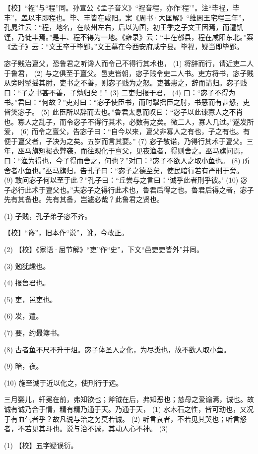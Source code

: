 \documentclass[12pt,UTF8]{ctexbook}
\begin{document}
【校】“裎”与“程”同。孙宣公《孟子音义》“裎音程，亦作‘程’”。注“毕裎，毕丰”，盖以丰即程也。毕、丰皆在咸阳。案《周书·大匡解》“维周王宅程三年”，孔晁注云：“程，地名，在岐州左右，后以为国，初王季之子文王因焉，而遭饥馑，乃徙丰焉。”是丰、程不得为一地。《雍录》云：“丰在鄠县，程在咸阳东北。”案《孟子》云：“文王卒于毕郢。”文王墓在今西安府咸宁县。毕裎，疑当即毕郢。

宓子贱治亶父，恐鲁君之听谗人而令己不得行其术也， (1) 将辞而行，请近吏二人于鲁君， (2) 与之俱至于亶父。邑吏皆朝，宓子贱令吏二人书。吏方将书，宓子贱从旁时掣摇其肘，吏书之不善，则宓子贱为之怒。吏甚患之，辞而请归。宓子贱曰：“子之书甚不善，子勉归矣！” (3) 二吏归报于君， (4) 曰：“宓子不得为书。”君曰：“何故？”吏对曰：“宓子使臣书，而时掣摇臣之肘，书恶而有甚怒，吏皆笑宓子。 (5) 此臣所以辞而去也。”鲁君太息而叹曰：“宓子以此谏寡人之不肖也。寡人之乱子，而令宓子不得行其术，必数有之矣。微二人，寡人几过。”遂发所爱， (6) 而令之亶父，告宓子曰：“自今以来，亶父非寡人之有也，子之有也。有便于亶父者，子决为之矣。五岁而言其要。” (7) 宓子敬诺，乃得行其术于亶父。三年，巫马旗短褐衣弊袭，而往观化于亶父，见夜渔者，得则舍之。巫马旗问焉，曰：“渔为得也，今子得而舍之，何也？”对曰：“宓子不欲人之取小鱼也。 (8) 所舍者小鱼也。”巫马旗归，告孔子曰：“宓子之德至矣，使民暗行若有严刑于旁。 (9) 敢问宓子何以至于此？”孔子曰：“丘尝与之言曰：‘诚乎此者刑乎彼。’ (10) 宓子必行此术于亶父也。”夫宓子之得行此术也，鲁君后得之也。鲁君后得之者，宓子先有其备也。先有其备，岂遽必哉？此鲁君之贤也。

(1) 子贱，孔子弟子宓不齐。

【校】“谗”，旧本作“说”，讹，今改正。

(2) 【校】《家语·屈节解》“吏”作“史”，下文“邑吏吏皆外”并同。

(3) 勉犹趣也。

(4) 报鲁君也。

(5) 吏，邑吏也。

(6) 发，遣。

(7) 要，约最簿书。

(8) 古者鱼不尺不升于俎。宓子体圣人之化，为尽类也，故不欲人取小鱼。

(9) 暗，夜。

(10) 施至诚于近以化之，使刑行于远。

三月婴儿，轩冕在前，弗知欲也；斧钺在后，弗知恶也；慈母之爱谕焉，诚也。故诚有诚乃合于情，精有精乃通于天。乃通于天， (1) 水木石之性，皆可动也，又况于有血气者乎？故凡说与治之务莫若诚。 (2) 听言哀者，不若见其哭也；听言怒者，不若见其斗也。说与治不诚，其动人心不神。 (3)

(1) 【校】五字疑误衍。
\end{document}
